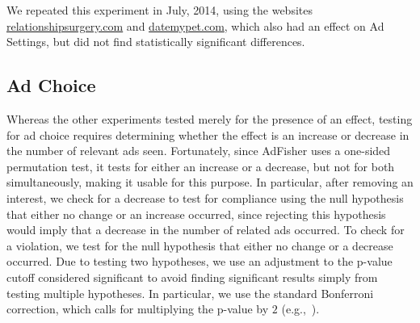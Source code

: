 \documentclass{article}
\begin{document}
We repeated this experiment in July, 2014, using the websites \url{relationshipsurgery.com} and \url{datemypet.com}, which also had an effect on Ad Settings, but did not find statistically significant differences.



\subsection{Ad Choice}

Whereas the other experiments tested merely for the presence of an effect, testing for ad choice requires determining whether the effect is an increase or decrease in the number of relevant ads seen.
Fortunately, since AdFisher uses a one-sided permutation test, it tests for either an increase or a decrease, but not for both simultaneously, making it usable for this purpose.
In particular, after removing an interest, we check for a decrease to test for compliance using the null hypothesis that either no change or an increase occurred, since rejecting this hypothesis would imply that a decrease in the number of related ads occurred.
To check for a violation, we test for the null hypothesis that either no change or a decrease occurred.
Due to testing two hypotheses, we use an adjustment to the p-value cutoff considered significant to avoid finding significant results simply from testing multiple hypotheses.
In particular, we use the standard Bonferroni correction, which calls for multiplying the p-value by $2$ (e.g.,~\cite{abdi07enc}).
\end{document}
